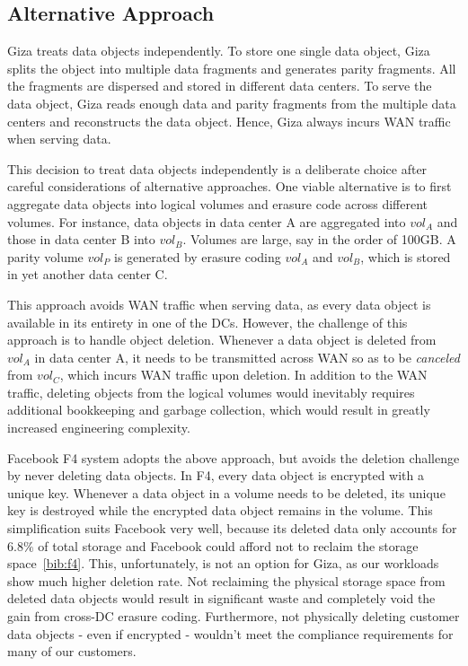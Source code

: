 \subsection{Alternative Approach}


Giza treats data objects independently. To store one single data object, Giza splits the object into multiple data fragments and generates parity fragments. All the fragments are dispersed and stored in different data centers. To serve the data object, Giza reads enough data and parity fragments from the multiple data centers and reconstructs the data object. Hence, Giza always incurs WAN traffic when serving data.

This decision to treat data objects independently is a deliberate choice after careful considerations of alternative approaches. One viable alternative is to first aggregate data objects into logical volumes and erasure code across different volumes. For instance, data objects in data center A are aggregated into $vol_A$ and those in data center B into $vol_B$. Volumes are large, say in the order of 100GB. A parity volume $vol_P$ is generated by erasure coding $vol_A$ and $vol_B$, which is stored in yet another data center C.

This approach avoids WAN traffic when serving data, as every data object is available in its entirety in one of the DCs. However, the challenge of this approach is to handle object deletion. Whenever a data object is deleted from $vol_A$ in data center A, it needs to be transmitted across WAN so as to be {\em canceled} from $vol_C$, which incurs WAN traffic upon deletion. In addition to the WAN traffic, deleting objects from the logical volumes would inevitably requires additional bookkeeping and garbage collection, which would result in greatly increased engineering complexity.

Facebook F4 system adopts the above approach, but avoids the deletion challenge by never deleting data objects. In F4, every data object is encrypted with a unique key. Whenever a data object in a volume needs to be deleted, its unique key is destroyed while the encrypted data object remains in the volume. This simplification suits Facebook very well, because its deleted data only accounts for $6.8\%$ of total storage and Facebook could afford not to reclaim the storage space~\ref{bib:f4}. This, unfortunately, is not an option for Giza, as our workloads show much higher deletion rate. Not reclaiming the physical storage space from deleted data objects would result in significant waste and completely void the gain from cross-DC erasure coding. Furthermore, not physically deleting customer data objects - even if encrypted - wouldn't meet the compliance requirements for many of our customers.

